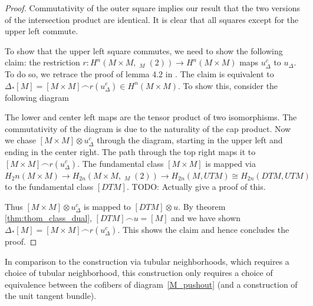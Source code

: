 \documentclass{scrartcl}
\theoremstyle{plain}
\theoremstyle{definition}
\newcommand{\capp}{\mathbin{\frown}}
\newcommand{\iso}{\cong}
\DeclareMathOperator{\cConf}{\overline{Conf}}
\begin{document}
\begin{proof}
    Commutativity of the outer square implies our result that the two versions of the intersection product are identical. It is clear that all squares except for the upper left commute. 

    To show that the upper left square commutes, we need to show the following claim: the restriction $r\colon H^n(M\times M, \cConf_M(2)) \to H^n(M\times M)$ maps $u_\Delta^c$ to $u_\Delta$. To do so, we retrace the proof of lemma 4.2 in \cite{hutchings2011cup}. The claim is equivalent to $\Delta_*[M] = [M\times M]\capp r(u^c_\Delta) \in H^n(M\times M)$. To show this, consider the following diagram
    \begin{center}
    \end{center}
    The lower and center left maps are the tensor product of two isomorphisms. The commutativity of the diagram is due to the naturality of the cap product. Now we chase $[M\times M]\otimes u_\Delta^c$ through the diagram, starting in the upper left and ending in the center right. The path through the top right maps it to $[M\times M]\capp r(u_\Delta^c)$. The fundamental class $[M\times M]$ is mapped via $H_2n(M\times M)\to H_{2n}(M\times M, \cConf_M(2))\to H_{2n}(M, UTM) \iso H_{2n}(DTM, UTM)$ to the fundamental class $[DTM]$. TODO: Actually give a proof of this.
    
    Thus $[M\times M]\otimes u_\Delta^c$ is mapped to $[DTM] \otimes u$. By theorem \ref{thm:thom_class_dual}, $[DTM] \capp u = [M]$ and we have shown $\Delta_*[M] = [M\times M]\capp r(u^c_\Delta)$. This shows the claim and hence concludes the proof.
\end{proof}


In comparison to the construction via tubular neighborhoods, which requires a choice of tubular neighborhood, this construction only requires a choice of equivalence between the cofibers of diagram~\ref{M_pushout}
\nocite{*} (and a construction of the unit tangent bundle).
\end{document}
